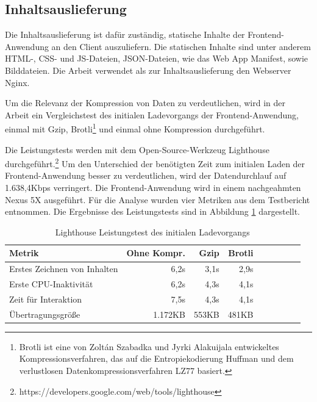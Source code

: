 \subsection{Inhaltsauslieferung}
\label{subsec:inhaltsauslieferung}
Die Inhaltsauslieferung ist dafür zuständig, statische Inhalte der Frontend-Anwendung
an den Client auszuliefern. Die statischen Inhalte sind unter anderem
HTML-, CSS- und JS-Dateien, JSON-Dateien, wie das Web App Manifest, sowie Bilddateien.
Die Arbeit verwendet als zur Inhaltsauslieferung den Webserver Nginx.

Um die Relevanz der Kompression von Daten zu verdeutlichen, wird in der Arbeit ein
Vergleichstest des initialen Ladevorgangs der Frontend-Anwendung,
einmal mit Gzip, Brotli\footnote{Brotli ist eine von Zoltán Szabadka
und Jyrki Alakuijala entwickeltes Kompressionsverfahren,
das auf die Entropiekodierung Huffman und dem verlustlosen
Datenkompressionsverfahren LZ77 basiert.\cite{BrotliGoogleOpenSourceBlog}} und einmal ohne Kompression durchgeführt. 

Die Leistungstests werden mit dem Open-Source-Werkzeug Lighthouse durchgeführt.\footnote{https://developers.google.com/web/tools/lighthouse}
Um den Unterschied der benötigten Zeit zum initialen Laden der Frontend-Anwendung
besser zu verdeutlichen, wird der Datendurchlauf auf \mbox{1.638,4Kbps} verringert.
Die Frontend-Anwendung wird in einem nachgeahmten Nexus 5X ausgeführt.
Für die Analyse wurden vier Metriken aus dem Testbericht entnommen.
Die Ergebnisse des Leistungstests sind in Abbildung \ref{tab:lighthouseleistungstestdesinitialenladevorgangs}
dargestellt.

\begin{table}[h]
\begin{center}
\begin{tabular}{l*{8}{r}}
Metrik & Ohne Kompr. & Gzip & Brotli \\
\hline
Erstes Zeichnen von Inhalten & 6,2s  & 3,1s & 2,9s \\
Erste CPU-Inaktivität        & 6,2s  & 4,3s & 4,1s \\
Zeit für Interaktion         & 7,5s  & 4,3s & 4,1s \\
Übertragungsgröße            & 1.172KB  &  553KB & 481KB \\
\end{tabular}
\end{center}
\caption{Lighthouse Leistungstest des initialen Ladevorgangs}
\label{tab:lighthouseleistungstestdesinitialenladevorgangs}
\end{table}

